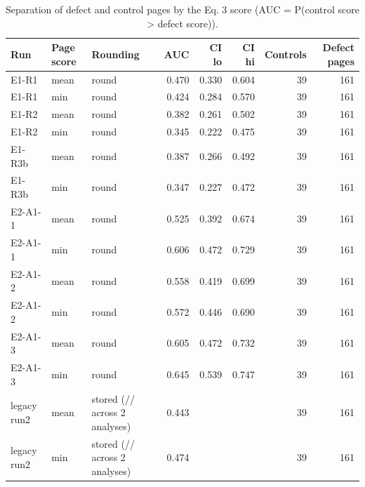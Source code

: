 \begin{table}[t]
\centering
\small
\caption{Separation of defect and control pages by the Eq. 3 score (AUC = P(control score > defect score)).}
\label{tab:e7-auc}
\begin{tabular}{lllrrrrr}
\toprule
Run & Page score & Rounding & AUC & CI lo & CI hi & Controls & Defect pages \\
\midrule
E1-R1 & mean & round & 0.470 & 0.330 & 0.604 & 39 & 161 \\
E1-R1 & min & round & 0.424 & 0.284 & 0.570 & 39 & 161 \\
E1-R2 & mean & round & 0.382 & 0.261 & 0.502 & 39 & 161 \\
E1-R2 & min & round & 0.345 & 0.222 & 0.475 & 39 & 161 \\
E1-R3b & mean & round & 0.387 & 0.266 & 0.492 & 39 & 161 \\
E1-R3b & min & round & 0.347 & 0.227 & 0.472 & 39 & 161 \\
E2-A1-1 & mean & round & 0.525 & 0.392 & 0.674 & 39 & 161 \\
E2-A1-1 & min & round & 0.606 & 0.472 & 0.729 & 39 & 161 \\
E2-A1-2 & mean & round & 0.558 & 0.419 & 0.699 & 39 & 161 \\
E2-A1-2 & min & round & 0.572 & 0.446 & 0.690 & 39 & 161 \\
E2-A1-3 & mean & round & 0.605 & 0.472 & 0.732 & 39 & 161 \\
E2-A1-3 & min & round & 0.645 & 0.539 & 0.747 & 39 & 161 \\
legacy run2 & mean & stored (// across 2 analyses) & 0.443 &  &  & 39 & 161 \\
legacy run2 & min & stored (// across 2 analyses) & 0.474 &  &  & 39 & 161 \\
\bottomrule
\end{tabular}
\end{table}
